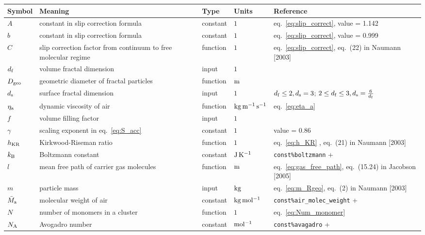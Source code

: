 \documentclass{article}
\begin{document}
\newcommand{\rr}{\raggedright}
\newcommand{\tn}{\tabularnewline\hline}
\renewcommand{\arraystretch}{1.5}


\begin{longtable}{|l|p{5.5cm}|l|l|p{4.5cm}|}
\hline \textbf{Symbol} & \textbf{Meaning}                                                       & \textbf{Type} & \textbf{Units}                        &  \textbf{Reference}                                \tn
\hline \endhead
$A$					   & \rr constant in slip correction formula								& constant			& $1$									& \rr eq.~\ref{eq:slip_correct}, value = 1.142		 \tn
$b$					   & \rr constant in slip correction formula								& constant			& $1$									& \rr eq.~\ref{eq:slip_correct}, value = 0.999		 \tn
$C$					   & \rr slip correction factor from continuum to free molecular regime		& function		& $1$									& \rr eq.~\ref{eq:slip_correct}, eq.~(22) in Naumann [2003]					 \tn
$d_{\rm f}$			   & \rr volume fractal dimension											& input			& $1$									& \rr 				 \tn
$D_{\rm geo}$		   & \rr geometric diameter of fractal particles								& function		& $\rm m$								& 							 \tn
$d_{\rm s}$			   & \rr surface fractal dimension											& input			& $1$									& \rr $d_{\rm f} \leq 2, d_{\rm s} = 3$; $2 \leq d_{\rm f} \leq 3, d_{\rm s} = \frac{6}{d_{\rm f}}$				 \tn
$\eta_{\rm a}$		   & \rr dynamic viscosity of air											& function		& $\rm kg \, m^{-1} \, s^{-1}$			& \rr eq.~\ref{eq:eta_a}							 \tn
$f$					   & \rr volume filling factor												& input			& $1$									& \rr 					 \tn
$\gamma$			   & \rr scaling exponent in eq.~\ref{eq:S_acc} 	 							& constant			& $1$									& \rr value = 0.86									 \tn
$h_{\rm KR}$		   & \rr Kirkwood-Riseman ratio												& function		& $1$									& \rr eq.~\ref{eq:h_KR}	, eq.~(21) in Naumann [2003] 					 \tn
$k_{\rm B}$			   & \rr Boltzmann constant													& constant		& $\rm J \, K^{-1}$	& \rr \verb+const%boltzmann+ 		 		 \tn
$l$					   & \rr mean free path of carrier gas molecules							& function			& $\rm m$								& \rr 	eq.~\ref{eq:gas_free_path}, eq.~(15.24) in Jacobson [2005]	 \tn
$m$					   & \rr particle mass														& input			& $\rm kg$								& \rr eq.~\ref{eq:m_Rgeo}, eq.~(2) in Naumann [2003] 					 \tn
$\bar{M}_{\rm a}$	   & \rr molecular weight of air											& constant		& $\rm kg \, mol^{-1}$					& \rr \verb+const%air_molec_weight+		 \tn
$N$					   & \rr number of monomers in a cluster									& function		& $1$									& \rr eq.~\ref{eq:Num_monomer}	 					 \tn
$N_{\rm A}$			   & \rr Avogadro number													& constant		& $\rm mol^{-1}$						& \rr \verb+const%avagadro+ 				 		 \tn

\end{longtable}
\end{document}
